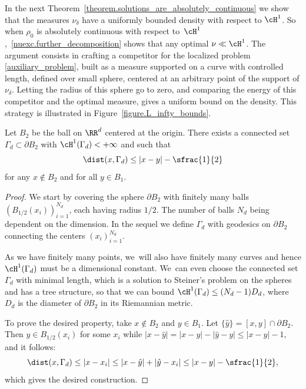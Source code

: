 In the next Theorem~\ref{theorem.solutions_are_absolutely_continuous} we show that the measures $\nu_\delta$ have a uniformly
bounded density with respect to $\cH^1$. So when $\rho_0$ is absolutely continuous with respect to~$\cH^1$,~\eqref{nuexc.further_decomposition}
shows that any optimal $\nu \ll \cH^1$.
The argument consists in crafting a competitor for the
localized problem \eqref{auxiliary_problem}, built as a measure supported on a curve with controlled length, defined over small sphere, centered at an arbitrary point of the support of $\nu_\delta$. Letting the radius of this sphere go to zero, and comparing the energy of this competitor and the optimal measure, gives a uniform bound on the density.
This strategy is illustrated in Figure~\ref{figure.L_infty_bounds}.

\begin{lemma}\label{lemma.curve_on_B2}
Let $B_2$ be the ball on $\RR^d$ centered at the origin. There exists a connected set $\Gamma_d \subset \partial B_2$ with $\cH^1(\Gamma_d) < +\infty$ and such that\vspace*{-3pt}
\[
\dist(x, \Gamma_d) \le |x - y| - \sfrac{1}{2}
\]
for any $x \not\in B_2$ and for all $y \in B_1$.
\end{lemma}

\begin{proof}
We start by covering the sphere $\partial B_2$ with finitely many balls $\left(B_{1/2}(x_i)\right)_{i = 1}^{N_d}$, each having radius $1/2$. The number of balls $N_d$ being dependent on the dimension. In the sequel we define $\Gamma_d$ with geodesics on $\partial B_2$ connecting the centers $\left(x_i\right)_{i = 1}^{N_d}$.

As we have finitely many points, we~will also have finitely many curves and hence $\cH^1(\Gamma_d)$ must be a dimensional constant. We~can even choose the connected set $\Gamma_d$ with minimal length,
which is a solution to Steiner's problem on the spheres and has a tree structure,
so that we can bound $\cH^1(\Gamma_d) \le (N_d - 1)D_d$, where $D_d$ is the diameter of $\partial B_2$ in its Riemannian metric.

To prove the desired property, take $x \not\in B_2$ and $y \in B_1$. Let $\{\hat y\} = [x,y]\cap \partial B_2$. Then $\hat y \in B_{1/2}(x_i)$ for some $x_i$
while $|x-\hat y|=|x-y|-|\hat y-y|\le |x-y|-1$, and it follows:
\[
\dist(x, \Gamma_d)
\le |x - x_i|
\le |x - \hat y| + |\hat y - x_i|
\le |x - y| - \sfrac{1}{2},
\]
which gives the desired construction.
\end{proof}

